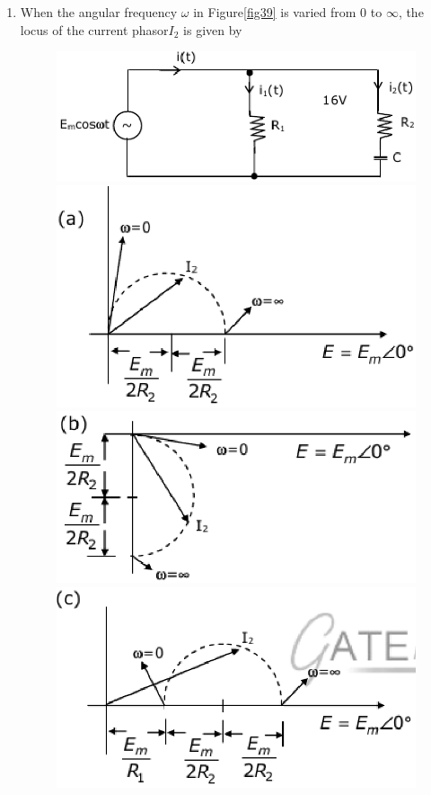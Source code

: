 \documentclass[journal,12pt,twocolumn]{IEEEtran}
\begin{document}
\begin{enumerate}
\item When the angular frequency $\omega$ in Figure\ref{fig39} is varied from 0 to $\infty$, the locus of the current phasor$ I_{2}$ is given by
\begin{figure}[!h]
\begin{center}
\includegraphics[scale=0.5]{./figs/fig39a.eps}
\includegraphics[scale=0.5]{./figs/fig39b.eps}
\includegraphics[scale=0.5]{./figs/fig39c.eps}
\includegraphics[scale=0.5]{./figs/fig39d.eps}

\end{center}
\end{figure}
\end{enumerate}
\end{document}
